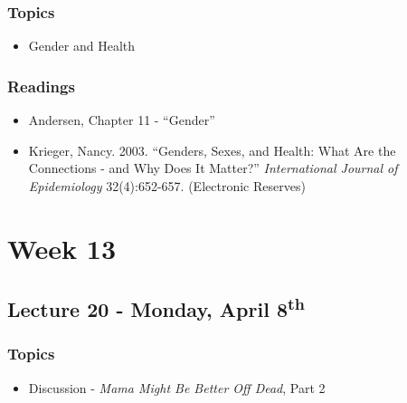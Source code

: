 \documentclass[]{book}
\providecommand{\tightlist}{%
  \setlength{\itemsep}{0pt}\setlength{\parskip}{0pt}}
\begin{document}
\hypertarget{topics-22}{%
\subsubsection*{Topics}\label{topics-22}}

\begin{itemize}
\tightlist
\item
  Gender and Health
\end{itemize}

\hypertarget{readings-20}{%
\subsubsection*{Readings}\label{readings-20}}

\begin{itemize}
\tightlist
\item
  Andersen, Chapter 11 - ``Gender''
\item
  Krieger, Nancy. 2003. ``Genders, Sexes, and Health: What Are the Connections - and Why Does It Matter?'' \emph{International Journal of Epidemiology} 32(4):652-657. (Electronic Reserves)
\end{itemize}

\hypertarget{week-13}{%
\section*{Week 13}\label{week-13}}

\hypertarget{lecture-20---monday-april-8th}{%
\subsection*{\texorpdfstring{Lecture 20 - Monday, April 8\textsuperscript{th}}{Lecture 20 - Monday, April 8th}}\label{lecture-20---monday-april-8th}}

\hypertarget{topics-23}{%
\subsubsection*{Topics}\label{topics-23}}

\begin{itemize}
\tightlist
\item
  Discussion - \emph{Mama Might Be Better Off Dead}, Part 2
\end{itemize}
\end{document}
